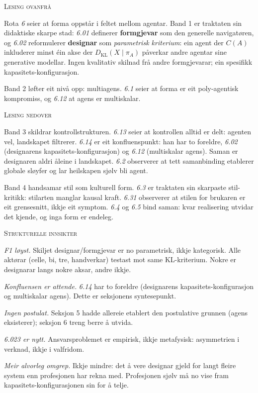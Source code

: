 \documentclass[a4paper,landscape,9pt]{article}
\begin{document}
\begin{minipage}[t]{0.325\textwidth}
{\scshape\small Lesing ovanfrå}

Rota \emph{6} seier at forma oppstår i feltet mellom agentar. Band 1 er traktaten sin didaktiske skarpe stad: \emph{6.01} definerer \textbf{formgjevar} som den generelle navigatøren, og \emph{6.02} reformulerer \textbf{designar} som \emph{parametrisk kriterium}: ein agent der $C(A)$ inkluderer minst éin akse der $D_{\mathrm{KL}}(X\mid\pi_A)$ påverkar andre agentar sine generative modellar. Ingen kvalitativ skilnad frå andre formgjevarar; ein spesifikk kapasitets-konfigurasjon.

Band 2 løfter eit nivå opp: multiagens. \emph{6.1} seier at forma er eit poly-agentisk kompromiss, og \emph{6.12} at agens er multiskalar.
\end{minipage}\hfill
\begin{minipage}[t]{0.325\textwidth}
{\scshape\small Lesing nedover}

Band 3 skildrar kontrollstrukturen. \emph{6.13} seier at kontrollen alltid er delt: agenten vel, landskapet filtrerer. \emph{6.14} er eit konfluenspunkt: han har to foreldre, \emph{6.02} (designarens kapasitets-konfigurasjon) og \emph{6.12} (multiskalar agens). Saman er designaren aldri åleine i landskapet. \emph{6.2} observerer at tett samanbinding etablerer globale sløyfer og lar heilskapen sjølv bli agent.

Band 4 handsamar stil som kulturell form. \emph{6.3} er traktaten sin skarpaste stil-kritikk: stilarten manglar kausal kraft. \emph{6.31} observerer at stilen for brukaren er eit grensesnitt, ikkje eit symptom. \emph{6.4} og \emph{6.5} bind saman: kvar realisering utvidar det kjende, og inga form er endeleg.
\end{minipage}\hfill
\begin{minipage}[t]{0.325\textwidth}
{\scshape\small Strukturelle innsikter}

\emph{F1 løyst.} Skiljet designar/formgjevar er no parametrisk, ikkje kategorisk. Alle aktørar (celle, bi, tre, handverkar) testast mot same KL-kriterium. Nokre er designarar langs nokre aksar, andre ikkje.

\emph{Konfluensen er attende.} \emph{6.14} har to foreldre (designarens kapasitets-konfigurasjon og multiskalar agens). Dette er seksjonens syntesepunkt.

\emph{Ingen postulat.} Seksjon 5 hadde allereie etablert den postulative grunnen (agens eksisterer); seksjon 6 treng berre å utvida.

\emph{\emph{6.023} er nytt.} Ansvarsproblemet er empirisk, ikkje metafysisk: asymmetrien i verknad, ikkje i valfridom.

\emph{Meir alvorleg omgrep.} Ikkje mindre: det å vere designar gjeld for langt fleire system enn profesjonen har rekna med. Profesjonen sjølv må no vise fram kapasitets-konfigurasjonen sin for å telje.
\end{minipage}
\end{document}
